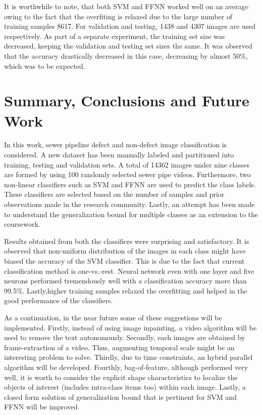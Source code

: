 \documentclass[letterpaper,12pt, onecolumn]{article}%
\begin{document}
It is worthwhile to note, that both SVM and FFNN worked well on an average owing to the fact that the overfiting is relaxed due to the large number of training samples 8617. For validation and testing, 1438 and 4307 images are used respectively. As part of a separate experiment, the training set size was decreased, keeping the validation and testing set sizes the same. It was observed that the accuracy drastically decreased in this case, decreasing by almost 50\%, which was to be expected.


\section{Summary, Conclusions and Future Work} \label{sec:summary_conclusion}
\noindent
In this work, sewer pipeline defect and non-defect image classification is considered. A new dataset has been manually labeled and partitioned into training, testing and validation sets. A total of 14362 images under nine classes are formed by using 100 randomly selected sewer pipe videos. Furthermore, two non-linear classifiers such as SVM and FFNN are used to predict the class labels. These classifiers are selected based on the number of samples and prior observations made in the research community. Lastly, an attempt has been made to understand the generalization bound for multiple classes as an extension to the coursework.    

Results obtained from both the classifiers were surprising and satisfactory. It is observed that non-uniform distribution of the images in each class might have biased the accuracy of the SVM classifier. This is due to the fact that current classification method is one-vs.-rest. Neural network even with one layer and five neurons performed tremendously well with a classification accuracy more than 99.5\%. Lastly,higher training samples relaxed the overfitting and helped in the good performance of the classifiers.  

As a continuation, in the near future some of these suggestions will be implemented. Firstly, instead of using image inpainting, a video algorithm will be used to remove the text autonomously. Secondly, each images are obtained by frame-extraction of a video. Thus, augmenting temporal scale might be an interesting problem to solve. Thirdly, due to time constraints, an hybrid parallel algorithm will be developed. Fourthly, bag-of-feature, although performed very well, it is worth to consider the explicit shape characteristics to localize the objects of interest (includes intra-class items too) within each image. Lastly, a closed form solution of generalization bound that is pertinent for SVM and FFNN will be improved.
\end{document}
